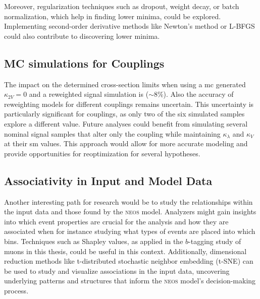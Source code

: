 Moreover, regularization techniques such as dropout, weight decay, or batch normalization, which help in finding lower minima, could be explored. Implementing second-order derivative methods like Newton's method or L-BFGS could also contribute to discovering lower minima.





\subsection{MC simulations for \ktwov Couplings}
The impact on the determined cross-section limits when using a \ac{mc} generated $\kappa_{2V} = 0$ and a reweighted signal simulation is ($\sim$8\%). Also the accuracy of reweighting models for different \ktwov couplings remains uncertain. This uncertainty is particularly significant for \ktwov couplings, as only two of the six simulated samples explore a different \ktwov value. Future analyses could benefit from simulating several nominal signal samples that alter only the \ktwov coupling while maintaining $\kappa_\lambda$ and $\kappa_V$ at their \ac{sm} values. This approach would allow for more accurate modeling and provide opportunities for reoptimization for several \ktwov hypotheses.


\subsection{Associativity in Input and Model Data}
Another interesting path for research would be to study the relationships within the input data and those found by the \textsc{neos} model. Analyzers might gain insights into which event properties are crucial for the analysis and how they are associated when for instance studying what types of events are placed into which bins. Techniques such as Shapley values, as applied in the $b$-tagging study of muons in this thesis, could be useful in this context. Additionally, dimensional reduction methods like t-distributed stochastic neighbor embedding (t-SNE) can be used to study and visualize associations in the input data, uncovering underlying patterns and structures that inform the \textsc{neos} model's decision-making process.

